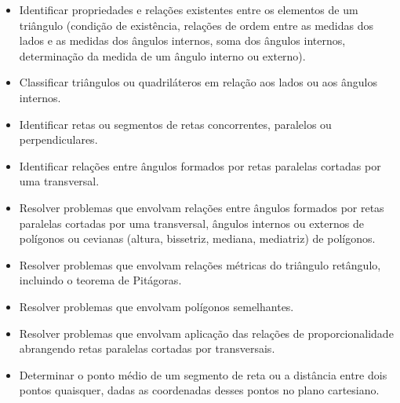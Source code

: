 \begin{escolha}
\begin{boxmedio}
\begin{boxmedio}
{\begin{boxpeq}
\begin{boxpeq}
{\begin{boxpeq}
\begin{boxmedio}
\begin{boxmedio}
\begin{boxpeq}
\begin{boxmedio}
\begin{boxpeq}
\begin{boxpeq}
\begin{boxpeq}
\begin{boxpeq}
\begin{boxmedio}
{\begin{boxmedio}
\begin{boxmedio}
\begin{boxpeq}
\begin{boxmedio}
\begin{boxpeq}
\begin{boxpeq}
\begin{boxpeq}
\begin{escolha}
{\begin{boxmedio}
\begin{boxpeq}
\begin{boxpeq}
\begin{boxpeq}
\begin{boxpeq}
\begin{boxpeq}
\begin{boxmedio}
\begin{boxpeq}
\begin{boxpeq}
\begin{boxpeq}
{\begin{boxpeq}
\begin{boxmedio}
\begin{boxpeq}
\begin{boxpeq}
\begin{boxpeq}
{\begin{boxpeq}
\begin{boxmedio}
{\begin{boxpeq}
\begin{boxpeq}
\begin{boxmedio}
\begin{boxmedio}
\begin{boxpeq}
\begin{boxpeq}
{\begin{boxpeq}
\begin{boxpeq}
\begin{boxpeq}
\begin{boxpeq}
\begin{boxpeq}
\begin{escolha}
\begin{escolha}
\begin{itemize}
  \item Identificar propriedades e relações existentes entre os elementos de um
triângulo (condição de existência, relações de ordem entre as medidas dos
lados e as medidas dos ângulos internos, soma dos ângulos internos,
determinação da medida de um ângulo interno ou externo).
  \item Classificar triângulos ou quadriláteros em relação aos lados ou aos
ângulos internos.
  \item Identificar retas ou segmentos de retas concorrentes, paralelos ou
perpendiculares.
  \item Identificar relações entre ângulos formados por retas paralelas cortadas
por uma transversal.
  \item Resolver problemas que envolvam relações entre ângulos formados por
retas paralelas cortadas por uma transversal, ângulos internos ou externos
de polígonos ou cevianas (altura, bissetriz, mediana, mediatriz) de
polígonos.
  \item Resolver problemas que envolvam relações métricas do triângulo
retângulo, incluindo o teorema de Pitágoras.
  \item Resolver problemas que envolvam polígonos semelhantes.
  \item Resolver problemas que envolvam aplicação das relações de
proporcionalidade abrangendo retas paralelas cortadas por transversais.
  \item Determinar o ponto médio de um segmento de reta ou a distância entre
dois pontos quaisquer, dadas as coordenadas desses pontos no plano
cartesiano.

\end{itemize} 


\end{escolha}
\end{escolha}
\end{boxpeq}
\end{boxpeq}
\end{boxpeq}
\end{boxpeq}
\end{boxpeq}}
\end{boxpeq}
\end{boxpeq}
\end{boxmedio}
\end{boxmedio}
\end{boxpeq}
\end{boxpeq}}
\end{boxmedio}
\end{boxpeq}}
\end{boxpeq}
\end{boxpeq}
\end{boxpeq}
\end{boxmedio}
\end{boxpeq}}
\end{boxpeq}
\end{boxpeq}
\end{boxpeq}
\end{boxmedio}
\end{boxpeq}
\end{boxpeq}
\end{boxpeq}
\end{boxpeq}
\end{boxpeq}
\end{boxmedio}}
\end{escolha}
\end{boxpeq}
\end{boxpeq}
\end{boxpeq}
\end{boxmedio}
\end{boxpeq}
\end{boxmedio}
\end{boxmedio}}
\end{boxmedio}
\end{boxpeq}
\end{boxpeq}
\end{boxpeq}
\end{boxpeq}
\end{boxmedio}
\end{boxpeq}
\end{boxmedio}
\end{boxmedio}
\end{boxpeq}}
\end{boxpeq}
\end{boxpeq}}
\end{boxmedio}
\end{boxmedio}
\end{escolha}
